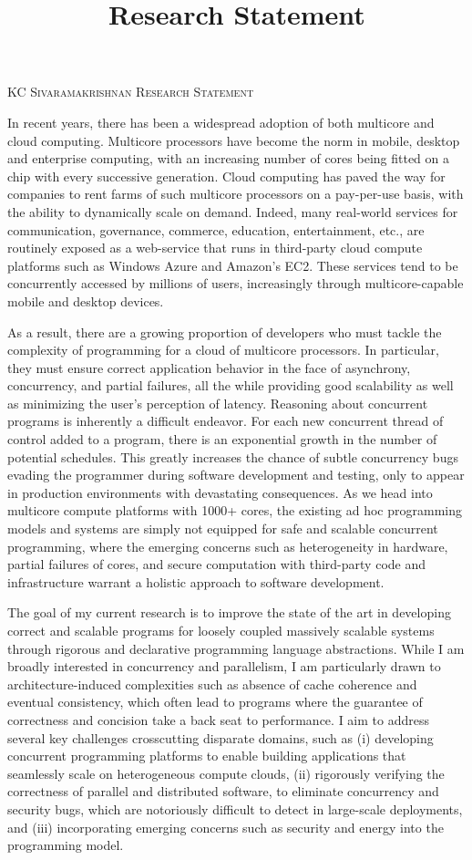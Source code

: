 \documentclass[screen,acmsmall,nonacm]{acmart}
\begin{document}
\title{Research Statement}

\noindent \Large \textsc{KC Sivaramakrishnan} \hfill \textsc{Research Statement} \normalsize

\noindent \hrulefill

In recent years, there has been a widespread adoption of both multicore and
cloud computing. Multicore processors have become the norm in mobile, desktop
and enterprise computing, with an increasing number of cores being fitted on a
chip with every successive generation. Cloud computing has paved the way for
companies to rent farms of such multicore processors on a pay-per-use basis,
with the ability to dynamically scale on demand. Indeed, many real-world
services for communication, governance, commerce, education, entertainment,
etc., are routinely exposed as a web-service that runs in third-party cloud
compute platforms such as Windows Azure and Amazon's EC2. These services tend
to be concurrently accessed by millions of users, increasingly through
multicore-capable mobile and desktop devices.

As a result, there are a growing proportion of developers who must tackle the
complexity of programming for a cloud of multicore processors. In particular,
they must ensure correct application behavior in the face of asynchrony,
concurrency, and partial failures, all the while providing good scalability as
well as minimizing the user's perception of latency. Reasoning about concurrent
programs is inherently a difficult endeavor. For each new concurrent thread of
control added to a program, there is an exponential growth in the number of
potential schedules. This greatly increases the chance of subtle concurrency
bugs evading the programmer during software development and testing, only to
appear in production environments with devastating consequences. As we head
into multicore compute platforms with 1000+ cores, the existing ad hoc
programming models and systems are simply not equipped for safe and scalable
concurrent programming, where the emerging concerns such as heterogeneity in
hardware, partial failures of cores, and secure computation with third-party
code and infrastructure warrant a holistic approach to software development.

The goal of my current research is to improve the state of the art in
developing correct and scalable programs for loosely coupled massively scalable
systems through rigorous and declarative programming language abstractions.
While I am broadly interested in concurrency and parallelism, I am particularly
drawn to architecture-induced complexities such as absence of cache coherence
and eventual consistency, which often lead to programs where the guarantee of
correctness and concision take a back seat to performance. I aim to address
several key challenges crosscutting disparate domains, such as (i) developing
concurrent programming platforms to enable building applications that
seamlessly scale on heterogeneous compute clouds, (ii) rigorously verifying the
correctness of parallel and distributed software, to eliminate concurrency and
security bugs, which are notoriously difficult to detect in large-scale
deployments, and (iii) incorporating emerging concerns such as security and
energy into the programming model.
\end{document}
